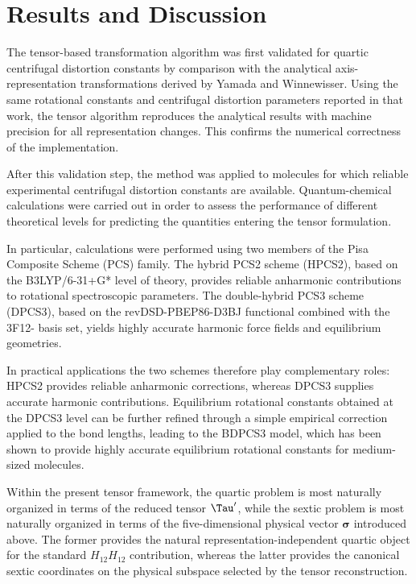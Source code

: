 \section{Results and Discussion}

The tensor-based transformation algorithm was first validated for quartic
centrifugal distortion constants by comparison with the analytical
axis-representation transformations derived by Yamada and
Winnewisser.\cite{Yamada1976} Using the same rotational constants and
centrifugal distortion parameters reported in that work, the tensor algorithm
reproduces the analytical results with machine precision for all
representation changes. This confirms the numerical correctness of the
implementation.

After this validation step, the method was applied to molecules for which
reliable experimental centrifugal distortion constants are available.
Quantum-chemical calculations were carried out in order to assess the
performance of different theoretical levels for predicting the quantities
entering the tensor formulation.

In particular, calculations were performed using two members of the Pisa
Composite Scheme (PCS) family. The hybrid PCS2 scheme (HPCS2), based on the
B3LYP/6-31+G* level of theory, provides reliable anharmonic contributions to
rotational spectroscopic parameters.  The double-hybrid PCS3 scheme (DPCS3),
based on the revDSD-PBEP86-D3BJ functional combined with the 3F12- basis
set, yields highly accurate harmonic force fields and equilibrium
geometries.

In practical applications the two schemes therefore play complementary
roles: HPCS2 provides reliable anharmonic corrections, whereas DPCS3 supplies
accurate harmonic contributions. Equilibrium rotational constants obtained at
the DPCS3 level can be further refined through a simple empirical correction
applied to the bond lengths, leading to the BDPCS3 model, which has been
shown to provide highly accurate equilibrium rotational constants for
medium-sized molecules.

Within the present tensor framework, the quartic problem is most naturally
organized in terms of the reduced tensor $\Tau'$, while the sextic problem is
most naturally organized in terms of the five-dimensional physical vector
$\boldsymbol\sigma$ introduced above.  The former provides the natural
representation-independent quartic object for the standard $H_{12}H_{12}$
contribution, whereas the latter provides the canonical sextic coordinates on
the physical subspace selected by the tensor reconstruction.

